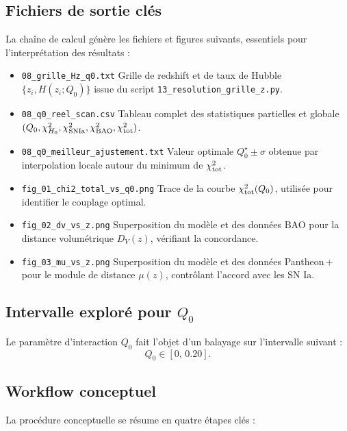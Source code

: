 \subsection{Fichiers de sortie clés}

La chaîne de calcul génère les fichiers et figures suivants, essentiels pour l’interprétation des résultats :

\begin{itemize}
  \item \texttt{08\_grille\_Hz\_q0.txt}  
    Grille de redshift et de taux de Hubble \(\{z_{i},H(z_{i};Q_{0})\}\) issue du script \texttt{13\_resolution\_grille\_z.py}.  
  \item \texttt{08\_q0\_reel\_scan.csv}  
    Tableau complet des statistiques partielles et globale  
    \((Q_{0},\chi^{2}_{H_{0}},\chi^{2}_{\rm SNIa},\chi^{2}_{\rm BAO},\chi^{2}_{\rm tot})\).  
  \item \texttt{08\_q0\_meilleur\_ajustement.txt}  
    Valeur optimale \(Q_{0}^{\star}\pm\sigma\) obtenue par interpolation locale autour du minimum de \(\chi^{2}_{\rm tot}\).  
  \item \texttt{fig\_01\_chi2\_total\_vs\_q0.png}  
    Trace de la courbe \(\chi^{2}_{\rm tot}(Q_{0})\), utilisée pour identifier le couplage optimal.  
  \item \texttt{fig\_02\_dv\_vs\_z.png}  
    Superposition du modèle et des données BAO pour la distance volumétrique \(D_{V}(z)\), vérifiant la concordance.  
  \item \texttt{fig\_03\_mu\_vs\_z.png}  
    Superposition du modèle et des données Pantheon\,+ pour le module de distance \(\mu(z)\), contrôlant l’accord avec les SN Ia.  
\end{itemize}

\subsection{Intervalle exploré pour \(Q_{0}\)}

Le paramètre d’interaction \(Q_{0}\) fait l’objet d’un balayage sur l’intervalle suivant :
\[
  Q_{0}\in[0,\,0.20].
\]

\subsection{Workflow conceptuel}

La procédure conceptuelle se résume en quatre étapes clés :

